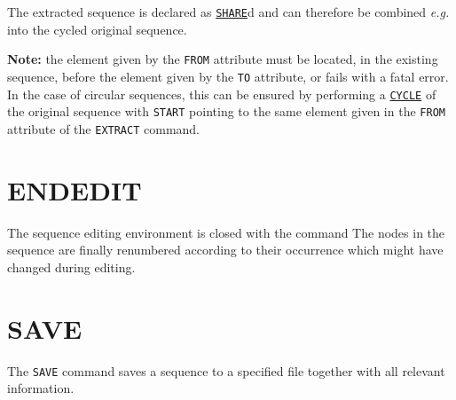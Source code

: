 The extracted sequence is declared as \hyperref[chap:sequence]{\texttt{SHARE}}d and
can therefore be combined \textsl{e.g.} into the cycled original sequence.

\textbf{Note:} the element given by the \texttt{FROM} attribute must be
located, in the existing sequence, before the element given by the
\texttt{TO} attribute, or \madx fails with a fatal error.
In the case of circular sequences, this can be ensured by performing a
\hyperref[sec:cycle]{\texttt{CYCLE}} of the original sequence with
\texttt{START} pointing to the same element given in the \texttt{FROM}
attribute of the \texttt{EXTRACT} command.


\section{ENDEDIT}
\label{sec:endedit}
The sequence editing environment is closed with the command
The nodes in the sequence are finally renumbered according to their occurrence
which might have changed during editing.




\section{SAVE}
\label{sec:save}

The \texttt{SAVE} command saves a sequence to a specified file together with all
relevant information.


